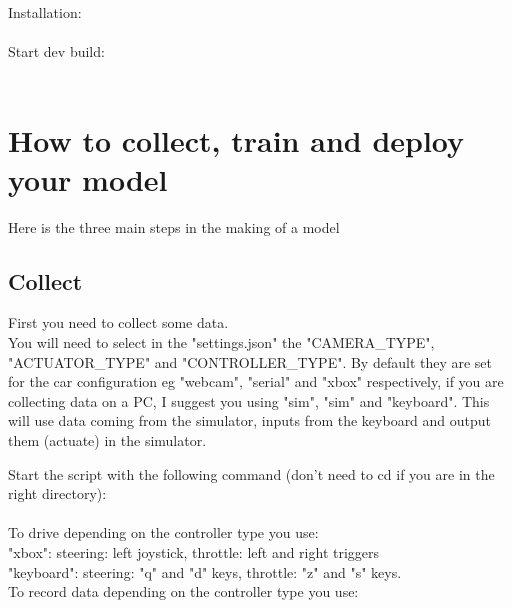 \documentclass[12pt]{article}
\begin{document}
Installation:\\

\noindent{}\\

Start dev build:\\

\noindent{}\\

\section{How to collect, train and deploy your model}
Here is the three main steps in the making of a model\\

\subsection{Collect}
First you need to collect some data.\\

You will need to select in the "settings.json" the "CAMERA_TYPE", "ACTUATOR_TYPE" and "CONTROLLER_TYPE". By default they are set for the car configuration eg "webcam", "serial" and "xbox" respectively, if you are collecting data on a PC, I suggest you using "sim", "sim" and "keyboard". This will use data coming from the simulator, inputs from the keyboard and output them (actuate) in the simulator.


Start the script with the following command (don't need to cd if you are in the right directory):\\

\noindent{}\\

To drive depending on the controller type you use:\\

"xbox": steering: left joystick, throttle: left and right triggers\\
"keyboard": steering: "q" and "d" keys, throttle: "z" and "s" keys.\\


To record data depending on the controller type you use:\\
\end{document}
